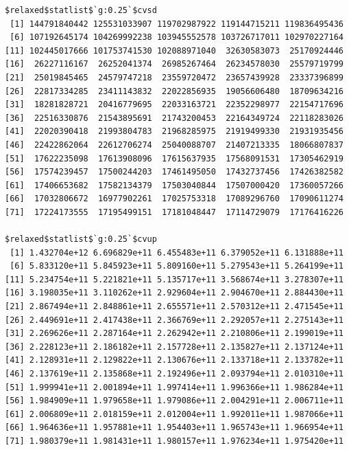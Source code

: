 \documentclass[
]{article}
\begin{document}
\begin{verbatim}
$relaxed$statlist$`g:0.25`$cvsd
 [1] 144791840442 125531033907 119702987922 119144715211 119836495436
 [6] 107192645174 104269992238 103945552578 103726717011 102970227164
[11] 102445017666 101753741530 102088971040  32630583073  25170924446
[16]  26227116167  26252041374  26985267464  26234578030  25579719799
[21]  25019845465  24579747218  23559720472  23657439928  23337396899
[26]  22817334285  23411143832  22022856935  19056606480  18709634216
[31]  18281828721  20416779695  22033163721  22352298977  22154717696
[36]  22516330876  21543895691  21743200453  22164349724  22118283026
[41]  22020390418  21993804783  21968285975  21919499330  21931935456
[46]  22422862064  22612706274  25040088707  21407213335  18066807837
[51]  17622235098  17613908096  17615637935  17568091531  17305462919
[56]  17574239457  17500244203  17461495050  17432737456  17426382582
[61]  17406653682  17582134379  17503040844  17507000420  17360057266
[66]  17032806672  16977902261  17025753318  17089296760  17090611274
[71]  17224173555  17195499151  17181048447  17114729079  17176416226

$relaxed$statlist$`g:0.25`$cvup
 [1] 1.432704e+12 6.696829e+11 6.455483e+11 6.379052e+11 6.131888e+11
 [6] 5.833120e+11 5.845923e+11 5.809160e+11 5.279543e+11 5.264199e+11
[11] 5.234754e+11 5.221821e+11 5.135717e+11 3.568674e+11 3.278307e+11
[16] 3.198035e+11 3.110262e+11 2.929604e+11 2.904670e+11 2.884430e+11
[21] 2.867494e+11 2.848861e+11 2.655571e+11 2.570312e+11 2.471545e+11
[26] 2.449691e+11 2.417438e+11 2.366769e+11 2.292057e+11 2.275143e+11
[31] 2.269626e+11 2.287164e+11 2.262942e+11 2.210806e+11 2.199019e+11
[36] 2.228123e+11 2.186182e+11 2.157728e+11 2.135827e+11 2.137124e+11
[41] 2.128931e+11 2.129822e+11 2.130676e+11 2.133718e+11 2.133782e+11
[46] 2.137619e+11 2.135868e+11 2.192496e+11 2.093794e+11 2.010310e+11
[51] 1.999941e+11 2.001894e+11 1.997414e+11 1.996366e+11 1.986284e+11
[56] 1.984909e+11 1.979658e+11 1.979086e+11 2.004291e+11 2.006711e+11
[61] 2.006809e+11 2.018159e+11 2.012004e+11 1.992011e+11 1.987066e+11
[66] 1.964636e+11 1.957881e+11 1.954403e+11 1.965743e+11 1.966954e+11
[71] 1.980379e+11 1.981431e+11 1.980157e+11 1.976234e+11 1.975420e+11


\end{verbatim}
\end{document}
